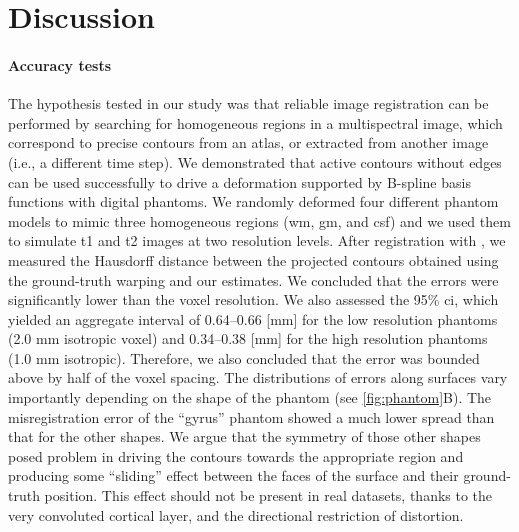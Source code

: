 \section{Discussion}
\label{sec:discussion}

\paragraph*{Accuracy tests}
The hypothesis tested in our study was that reliable image registration can be performed
  by searching for homogeneous regions in a multispectral image, which correspond to precise contours
  from an atlas, or extracted from another image (i.e., a different time step).
We demonstrated that active contours without edges can be used successfully to drive a
  deformation supported by B-spline basis functions with digital phantoms.
We randomly deformed four different phantom models to mimic three homogeneous regions
  (\gls*{wm}, \gls*{gm}, and \acrlong*{csf}) and we used them to simulate \gls*{t1} and \gls*{t2}
  images at two resolution levels.
After registration with \regseg{}, we measured the Hausdorff distance between the
  projected contours obtained using the ground-truth warping and our estimates.
We concluded that the errors were significantly lower than the voxel resolution.
We also assessed the 95\% \gls*{ci}, which yielded an aggregate interval of
  0.64--0.66 [mm] for the low resolution phantoms (2.0 mm isotropic voxel) and
  0.34--0.38 [mm] for the high resolution phantoms (1.0 mm isotropic).
Therefore, we also concluded that the error was bounded above by half of the
  voxel spacing.
The distributions of errors along surfaces vary importantly depending on the shape of the
  phantom (see \autoref{fig:phantom}B).
The misregistration error of the ``gyrus'' phantom showed a much lower spread than that
  for the other shapes.
We argue that the symmetry of those other shapes posed problem in driving the contours
  towards the appropriate region and producing some ``sliding'' effect between the
  faces of the surface and their ground-truth position.
This effect should not be present in real datasets, thanks to the very convoluted cortical
  layer, and the directional restriction of distortion.

